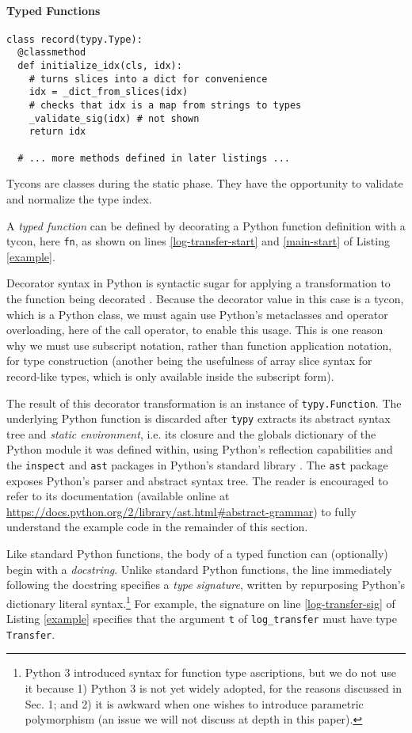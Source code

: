 \documentclass[preprint,10pt]{sigplanconf}
\newcommand{\lip}[1]{\lstinline[language=Python,basicstyle=\ttfamily\small,deletendkeywords={tuple,buffer,map}]{#1}}
\begin{document}
\paragraph{Typed Functions}

\begin{codelisting}
\begin{lstlisting}
class record(typy.Type):
  @classmethod
  def initialize_idx(cls, idx):
    # turns slices into a dict for convenience
    idx = _dict_from_slices(idx)
    # checks that idx is a map from strings to types
    _validate_sig(idx) # not shown
    return idx

  # ... more methods defined in later listings ...
\end{lstlisting}
\caption{Tycons are classes during the static phase. They have the opportunity to validate and normalize the type index.}
\label{record_init}
\end{codelisting}

A \emph{typed function} can be defined by decorating a Python function definition with a tycon, here \lip{fn}, as shown on lines \ref{log-transfer-start} and \ref{main-start} of Listing \ref{example}. 

Decorator syntax in Python is syntactic sugar for applying a transformation to the function being decorated \cite{python}. Because the decorator value in this case is a tycon, which is a Python class, we must again use Python's  metaclasses and operator overloading, here of the call operator, to enable this usage. This is one reason why we must use subscript notation, rather than function application notation, for type construction (another being the usefulness of array slice syntax for record-like types, which is only available inside the subscript form). 

The result of this decorator transformation is  an instance of \lip{typy.Function}. The underlying Python function is discarded after \lip{typy} extracts its abstract syntax tree and \emph{static environment}, i.e. its closure and the globals dictionary of the Python module it was defined within, using Python's reflection capabilities and the \lip{inspect} and \lip{ast} packages in Python's standard library \cite{python}. The \lip{ast} package exposes Python's parser and abstract syntax tree. The reader is encouraged to refer to its documentation (available online at \url{https://docs.python.org/2/library/ast.html#abstract-grammar}) to fully understand the example code in the remainder of this section. 

Like standard Python functions, the body of a typed function can (optionally) begin with a \emph{docstring}. Unlike standard Python functions, the line immediately following the docstring specifies a \emph{type signature}, written by repurposing Python's dictionary literal syntax.\footnote{Python 3 introduced syntax for function type ascriptions, but we do not use it because 1) Python 3 is not yet widely adopted, for the reasons discussed in Sec. 1; and 2) it is awkward when one wishes to introduce parametric polymorphism (an issue we will not discuss at depth in this paper).} For example, the signature on line \ref{log-transfer-sig} of Listing \ref{example} specifies that the argument \lip{t} of \lip{log_transfer} must have type \lip{Transfer}. 
\end{document}
